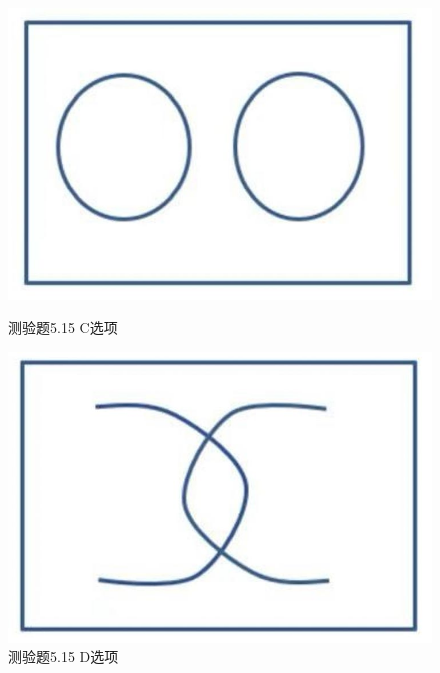 \documentclass[UTF8, heading=true]{ctexart}
\begin{document}
\begin{figure}[H]
    \centering
    \begin{minipage}[t]{0.3\textwidth}
        \centering
        \includegraphics[width=1\textwidth]{5.15_3.jpg} %
        \caption{测验题5.15 C选项}
    \end{minipage}
	  \hspace{0.1\textwidth} %
    \begin{minipage}[t]{0.3\textwidth}
        \centering
        \includegraphics[width=1\textwidth]{5.15_4.jpg} %
        \caption{测验题5.15 D选项}
\end{minipage}
\end{figure}
\end{document}
